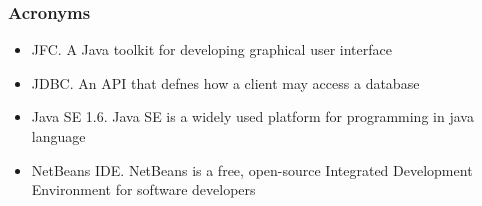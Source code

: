     \subsubsection{Acronyms}
    \begin{itemize}
    \item JFC. A Java toolkit for developing graphical user interface
    \item JDBC. An API that defnes how a client may access a database
    \item Java SE 1.6. Java SE is a widely used platform for programming in java language
    \item NetBeans IDE. NetBeans is a free, open-source Integrated Development Environment for software developers
     \end{itemize}